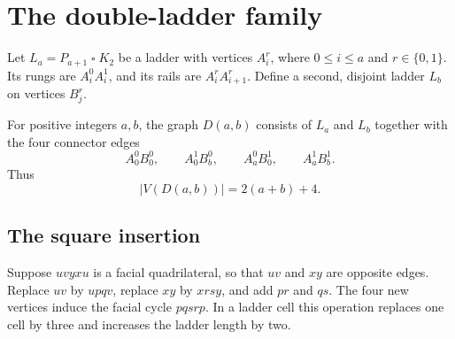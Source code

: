 \section{The double-ladder family}
\label{sec:double-ladders}

Let \(L_a=P_{a+1}\mathbin{\square}K_2\) be a ladder with vertices
\(A_i^r\), where \(0\le i\le a\) and \(r\in\{0,1\}\).  Its rungs are
\(A_i^0A_i^1\), and its rails are \(A_i^rA_{i+1}^r\).  Define a second,
disjoint ladder \(L_b\) on vertices \(B_j^r\).

\begin{definition}
\label{def:double-ladder}
For positive integers \(a,b\), the graph \(D(a,b)\) consists of \(L_a\) and
\(L_b\) together with the four connector edges
\begin{equation}
\label{eq:connectors}
 A_0^0B_0^0,\qquad
 A_0^1B_b^0,\qquad
 A_a^0B_0^1,\qquad
 A_a^1B_b^1.
\end{equation}
Thus
\[
 |V(D(a,b))|=2(a+b)+4.
\]
\end{definition}

\subsection{The square insertion}

Suppose \(uvyxu\) is a facial quadrilateral, so that \(uv\) and \(xy\) are
opposite edges.  Replace \(uv\) by \(u p q v\), replace \(xy\) by
\(x r s y\), and add \(pr\) and \(qs\).  The four new vertices induce the
facial cycle \(p q s r p\).  In a ladder cell this operation replaces one
cell by three and increases the ladder length by two.

